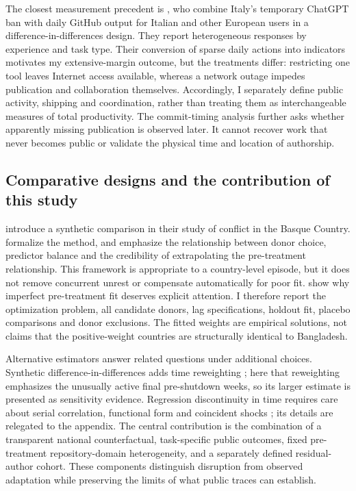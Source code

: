 The closest measurement precedent is \citet{kreitmeir2024}, who combine Italy's temporary ChatGPT ban with daily GitHub output for Italian and other European users in a difference-in-differences design. They report heterogeneous responses by experience and task type. Their conversion of sparse daily actions into indicators motivates my extensive-margin outcome, but the treatments differ: restricting one tool leaves Internet access available, whereas a network outage impedes publication and collaboration themselves. Accordingly, I separately define public activity, shipping and coordination, rather than treating them as interchangeable measures of total productivity. The commit-timing analysis further asks whether apparently missing publication is observed later. It cannot recover work that never becomes public or validate the physical time and location of authorship.

\subsection{Comparative designs and the contribution of this study}

\citet{abadie2003} introduce a synthetic comparison in their study of conflict in the Basque Country. \citet*{abadie2010} formalize the method, and \citet{abadie2015,abadie2021} emphasize the relationship between donor choice, predictor balance and the credibility of extrapolating the pre-treatment relationship. This framework is appropriate to a country-level episode, but it does not remove concurrent unrest or compensate automatically for poor fit. \citet{ferman2021} show why imperfect pre-treatment fit deserves explicit attention. I therefore report the optimization problem, all candidate donors, lag specifications, holdout fit, placebo comparisons and donor exclusions. The fitted weights are empirical solutions, not claims that the positive-weight countries are structurally identical to Bangladesh.

Alternative estimators answer related questions under additional choices. Synthetic difference-in-differences adds time reweighting \citep{arkhangelsky2021}; here that reweighting emphasizes the unusually active final pre-shutdown weeks, so its larger estimate is presented as sensitivity evidence. Regression discontinuity in time requires care about serial correlation, functional form and coincident shocks \citep{hausman2018}; its details are relegated to the appendix. The central contribution is the combination of a transparent national counterfactual, task-specific public outcomes, fixed pre-treatment repository-domain heterogeneity, and a separately defined residual-author cohort. These components distinguish disruption from observed adaptation while preserving the limits of what public traces can establish.
